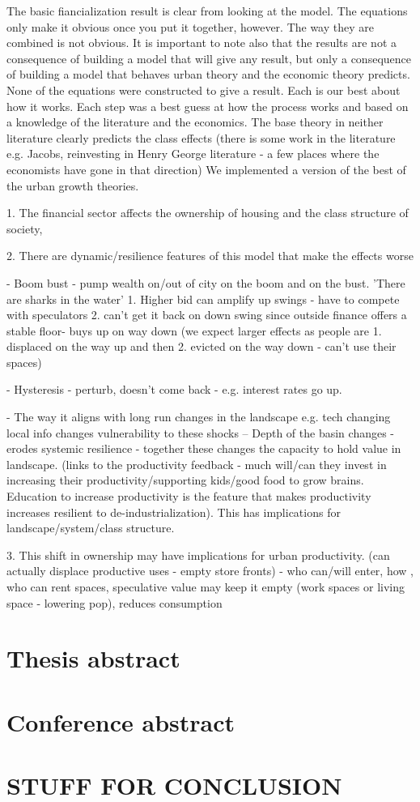 The basic fiancialization result is clear from looking at the model. The equations only make it obvious once you put it together, however. The way they are combined is not obvious.  It is important to note also that the results are not a consequence of building a model that will give any result, but only a consequence of building a model that behaves urban theory and the economic theory predicts. None of the equations were constructed to give a result. Each is our best about how it works. Each step was a best guess at how the process works and based on a knowledge of the literature and the economics. The base theory in neither literature clearly predicts the class effects (there is some work in the literature e.g. Jacobs, reinvesting in Henry George literature - a few places where the economists have gone in that direction) We implemented a version of the best of the urban growth theories.


1. The financial sector affects the ownership of housing and the class structure of society, 

2. There are dynamic/resilience features of this model that make the effects worse

- Boom bust - pump wealth on/out of city on the boom and on the bust. 'There are sharks in the water' 1. Higher bid can amplify up swings - have to compete with speculators 2. can't get it back on down swing since outside finance offers a stable floor- buys up on way down (we expect larger effects as people are 1. displaced on the way up and then 2. evicted on the way down - can't use their spaces)

- Hysteresis - perturb, doesn't come back - e.g. interest rates go up.

- The way it aligns with long run changes in the landscape e.g. tech changing local info changes vulnerability to these shocks -- Depth of the basin changes - erodes systemic resilience - together these changes the capacity to hold value in landscape. (links to the productivity feedback - much will/can they invest in increasing their productivity/supporting kids/good food to grow brains. Education to increase productivity is the feature that makes productivity increases resilient to de-industrialization). This has implications for landscape/system/class structure.

3. This shift in ownership may have implications for urban productivity. (can actually displace productive uses - empty store fronts) - who can/will enter, how , who can rent spaces, speculative value may keep it empty (work spaces or living space - lowering pop), reduces consumption

\section{Thesis abstract}

\section{Conference abstract}


\section{STUFF FOR CONCLUSION}